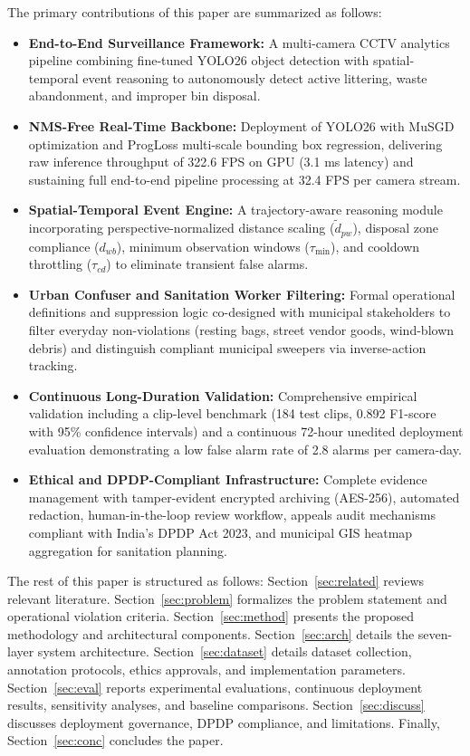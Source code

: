 \documentclass[conference]{IEEEtran}
\begin{document}
The primary contributions of this paper are summarized as follows:
\begin{itemize}
\item \textbf{End-to-End Surveillance Framework:} A multi-camera CCTV analytics pipeline combining fine-tuned YOLO26 object detection with spatial-temporal event reasoning to autonomously detect active littering, waste abandonment, and improper bin disposal.
\item \textbf{NMS-Free Real-Time Backbone:} Deployment of YOLO26 with MuSGD optimization and ProgLoss multi-scale bounding box regression, delivering raw inference throughput of 322.6 FPS on GPU (3.1 ms latency) and sustaining full end-to-end pipeline processing at 32.4 FPS per camera stream.
\item \textbf{Spatial-Temporal Event Engine:} A trajectory-aware reasoning module incorporating perspective-normalized distance scaling ($\tilde{d}_{pw}$), disposal zone compliance ($d_{wb}$), minimum observation windows ($\tau_{\min}$), and cooldown throttling ($\tau_{cd}$) to eliminate transient false alarms.
\item \textbf{Urban Confuser and Sanitation Worker Filtering:} Formal operational definitions and suppression logic co-designed with municipal stakeholders to filter everyday non-violations (resting bags, street vendor goods, wind-blown debris) and distinguish compliant municipal sweepers via inverse-action tracking.
\item \textbf{Continuous Long-Duration Validation:} Comprehensive empirical validation including a clip-level benchmark (184 test clips, 0.892 F1-score with 95\% confidence intervals) and a continuous 72-hour unedited deployment evaluation demonstrating a low false alarm rate of 2.8 alarms per camera-day.
\item \textbf{Ethical and DPDP-Compliant Infrastructure:} Complete evidence management with tamper-evident encrypted archiving (AES-256), automated redaction, human-in-the-loop review workflow, appeals audit mechanisms compliant with India's DPDP Act 2023, and municipal GIS heatmap aggregation for sanitation planning.
\end{itemize}

The rest of this paper is structured as follows: Section~\ref{sec:related} reviews relevant literature. Section~\ref{sec:problem} formalizes the problem statement and operational violation criteria. Section~\ref{sec:method} presents the proposed methodology and architectural components. Section~\ref{sec:arch} details the seven-layer system architecture. Section~\ref{sec:dataset} details dataset collection, annotation protocols, ethics approvals, and implementation parameters. Section~\ref{sec:eval} reports experimental evaluations, continuous deployment results, sensitivity analyses, and baseline comparisons. Section~\ref{sec:discuss} discusses deployment governance, DPDP compliance, and limitations. Finally, Section~\ref{sec:conc} concludes the paper.
\end{document}
